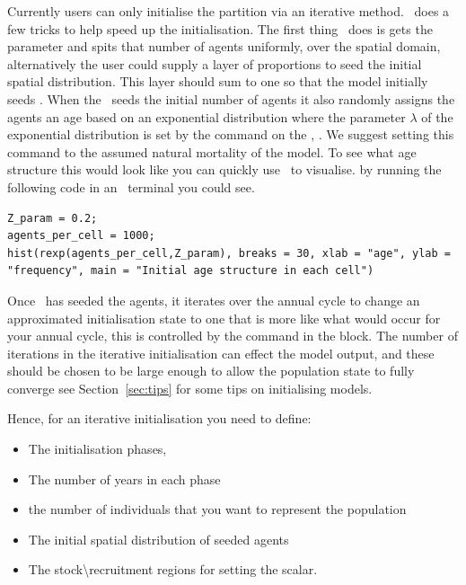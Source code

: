 Currently users can only initialise the partition via an iterative method. \IBM\ does a few tricks to help speed up the initialisation. The first thing \IBM\ does is gets the parameter  and spits that number of agents uniformly, over the spatial domain, alternatively the user could supply a layer  of proportions to seed the initial spatial distribution. This layer should sum to one so that the model initially seeds . When the \IBM\ seeds the initial number of agents it also randomly assigns the agents an age based on an exponential distribution where the parameter $\lambda$ of the exponential distribution is set by the command on the , . We suggest setting this command to the assumed natural mortality of the model. To see what age structure this would look like you can quickly use \R\ to visualise. by running the following code in an \R\ terminal you could see.

\begin{lstlisting}
Z_param = 0.2;
agents_per_cell = 1000;
hist(rexp(agents_per_cell,Z_param), breaks = 30, xlab = "age", ylab = "frequency", main = "Initial age structure in each cell")
\end{lstlisting}

Once \IBM\ has seeded the agents, it iterates over the annual cycle to change an approximated initialisation state to one that is more like what would occur for your annual cycle, this is controlled by the  command in the  block. The number of iterations in the iterative initialisation can effect the model output, and these should be chosen to be large enough to allow the population state to fully converge see Section~\ref{sec:tips} for some tips on initialising models.

Hence, for an iterative initialisation you need to define:
\begin{itemize}
  \item The initialisation phases,
  \item The number of years in each phase
  \item the number of individuals that you want to represent the population
  \item The initial spatial distribution of seeded agents
  \item The stock\textbackslash recruitment regions for setting the scalar.
\end{itemize}

